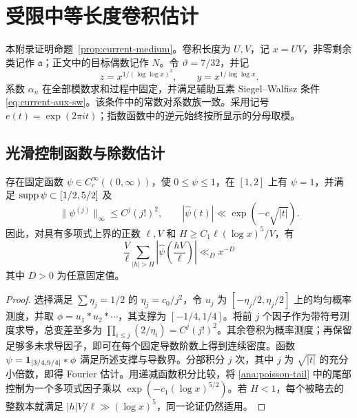 \section{受限中等长度卷积估计}
\label{app:medium}

本附录证明命题~\ref{prop:current-medium}。卷积长度为 $U,V$，记 $x=UV$，非零剩余类记作 $\mathfrak{a}$；正文中的目标偶数记作 $N$。令 $\vartheta=7/32$，并记
\[
 z=x^{1/(\log\log x)^3},\qquad y=x^{1/\log\log x}.
\]
系数 $\alpha_n$ 在全部模数求和过程中固定，并满足辅助互素 Siegel--Walfisz 条件 \eqref{eq:current-aux-sw}。该条件中的常数对系数族一致。采用记号 $e(t)=\exp(2\pi it)$；指数函数中的逆元始终按所显示的分母取模。

\subsection{光滑控制函数与除数估计}

\begin{lemma}\label{ana:majorant}
存在固定函数 $\psi\in C_c^\infty((0,\infty))$，使 $0\le\psi\le1$，在 $[1,2]$ 上有 $\psi=1$，并满足 $\operatorname{supp}\psi\subset[1/2,5/2]$ 及
\[
 \|\psi^{(j)}\|_\infty\le C^j(j!)^2,
 \qquad |\widehat\psi(t)|\ll \exp(-c\sqrt{|t|}).
\]
因此，对具有多项式上界的正数 $\ell,V$ 和 $H\ge C_1\ell(\log x)^5/V$，有
\begin{equation}
 \frac V\ell\sum_{|h|>H}
       \left|\widehat\psi\left(\frac{hV}{\ell}\right)\right|
       \ll_D x^{-D}
 \label{ana:poisson-tail}
\end{equation}
其中 $D>0$ 为任意固定值。
\end{lemma}

\begin{proof}
选择满足 $\sum \eta_j=1/2$ 的 $\eta_j=c_0/j^2$，令 $u_j$ 为 $[-\eta_j/2,\eta_j/2]$ 上的均匀概率测度，并取 $\phi=u_1*u_2*\cdots$，其支撑为 $[-1/4,1/4]$。将前 $j$ 个因子作为带符号测度求导，总变差至多为 $\prod_{i\le j}(2/\eta_i)=C^j(j!)^2$。其余卷积为概率测度；再保留足够多未求导因子，即可在每个固定导数阶数上得到连续密度。函数 $\psi=\mathbf 1_{[3/4,9/4]}*\phi$ 满足所述支撑与导数界。分部积分 $j$ 次，其中 $j$ 为 $\sqrt{|t|}$ 的充分小倍数，即得 Fourier 估计。用递减函数积分比较，将 \eqref{ana:poisson-tail} 中的尾部控制为一个多项式因子乘以 $\exp(-c_1(\log x)^{5/2})$。若 $H<1$，每个被略去的整数本就满足 $|h|V/\ell\gg(\log x)^5$，同一论证仍然适用。
\end{proof}


